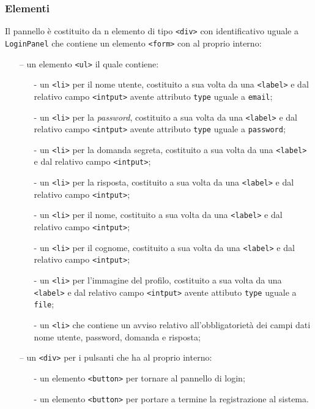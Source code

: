 \subsubsection*{Elementi}
Il pannello è costituito da n elemento di tipo \verb'<div>' con identificativo uguale a \verb'LoginPanel' che contiene un elemento \verb'<form>' con al proprio interno:
\begin{itemize}
  \item[--] un elemento \verb'<ul>' il quale contiene:
  \begin{itemize}
    \item[-] un \verb'<li>' per il nome utente, costituito a sua volta da una \verb'<label>' e dal relativo campo \verb'<intput>' avente attributo \verb'type' uguale a \verb'email';
    \item[-] un \verb'<li>' per la \textit{password}, costituito a sua volta da una \verb'<label>' e dal relativo campo \verb'<intput>' avente attributo \verb'type' uguale a \verb'password';
    \item[-] un \verb'<li>' per la domanda segreta, costituito a sua volta da una \verb'<label>' e dal relativo campo \verb'<intput>';
    \item[-] un \verb'<li>' per la risposta, costituito a sua volta da una \verb'<label>' e dal relativo campo \verb'<intput>';
    \item[-] un \verb'<li>' per il nome, costituito a sua volta da una \verb'<label>' e dal relativo campo \verb'<intput>';
    \item[-] un \verb'<li>' per il cognome, costituito a sua volta da una \verb'<label>' e dal relativo campo \verb'<intput>';
    \item[-] un \verb'<li>' per l'immagine del profilo, costituito a sua volta da una \verb'<label>' e dal relativo campo \verb'<intput>' avente attibuto \verb'type' uguale a \verb'file';
    \item[-] un \verb'<li>' che contiene un avviso relativo all'obbligatorietà dei campi dati nome utente, password, domanda e risposta;
  \end{itemize}
  \item[--] un \verb'<div>' per i pulsanti che ha al proprio interno:
  \begin{itemize}
    \item[-] un elemento \verb'<button>' per tornare al pannello di login;
    \item[-] un elemento \verb'<button>' per portare a termine la registrazione al sistema.
  \end{itemize}
\end{itemize}


